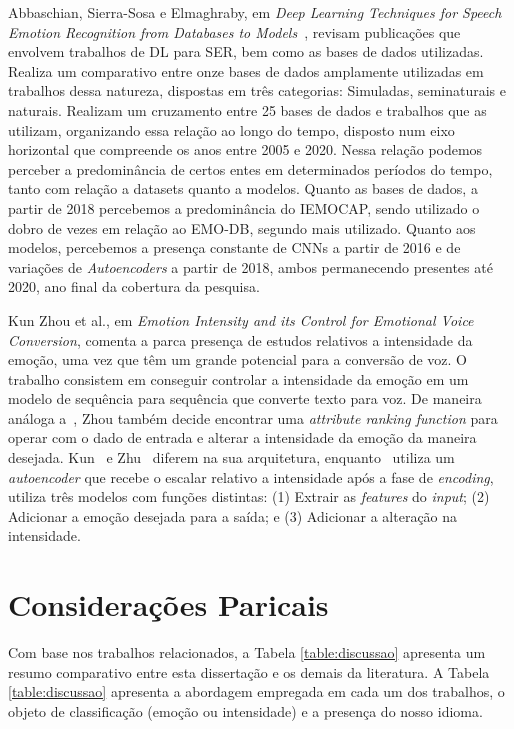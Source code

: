 Abbaschian, Sierra-Sosa e Elmaghraby, em \textit{Deep Learning Techniques for Speech Emotion Recognition from Databases to Models}~\cite{32}, revisam publicações que envolvem trabalhos de \acrshort{DL} para \acrshort{SER}, bem como as bases de dados utilizadas. Realiza um comparativo entre onze bases de dados amplamente utilizadas em trabalhos dessa natureza, dispostas em três categorias: Simuladas, seminaturais e naturais. Realizam um cruzamento entre 25 bases de dados e trabalhos que as utilizam, organizando essa relação ao longo do tempo, disposto num eixo horizontal que compreende os anos entre 2005 e 2020. Nessa relação podemos perceber a predominância de certos entes em determinados períodos do tempo, tanto com relação a datasets quanto a modelos. Quanto as bases de dados, a partir de 2018 percebemos a predominância do IEMOCAP, sendo utilizado o dobro de vezes em relação ao EMO-DB, segundo mais utilizado. Quanto aos modelos, percebemos a presença constante de \acrshort{CNN}s a partir de 2016 e de variações de \textit{Autoencoders} a partir de 2018, ambos permanecendo presentes até 2020, ano final da cobertura da pesquisa.

Kun Zhou et al., em \textit{Emotion Intensity and its Control for Emotional Voice Conversion}\cite{18}, comenta a parca presença de estudos relativos a intensidade da emoção, uma vez que têm um grande potencial para a conversão de voz. O trabalho consistem em conseguir controlar a intensidade da emoção em um modelo de sequência para sequência que converte texto para voz. De maneira análoga a~\cite{63}, Zhou também decide encontrar uma \textit{attribute ranking function} para operar com o dado de entrada e alterar a intensidade da emoção da maneira desejada. Kun~\cite{18} e Zhu~\cite{63} diferem na sua arquitetura, enquanto~\cite{63} utiliza um \textit{autoencoder} que recebe o escalar relativo a intensidade após a fase de \textit{encoding},~\cite{18} utiliza três modelos com funções distintas: (1) Extrair as \textit{features} do \textit{input}; (2) Adicionar a emoção desejada para a saída; e (3) Adicionar a alteração na intensidade.


\section{Considerações Paricais}

Com base nos trabalhos relacionados, a Tabela \ref{table:discussao} apresenta um resumo comparativo entre esta dissertação e os demais da literatura. A Tabela \ref{table:discussao} apresenta a abordagem empregada em cada um dos trabalhos, o objeto de classificação (emoção ou intensidade) e a presença do nosso idioma.

